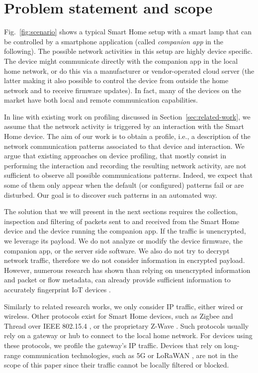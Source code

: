 \section{Problem statement and scope}
\label{sec:problem}

Fig.~\ref{fig:scenario} shows a typical Smart Home setup with a smart lamp that can be controlled by a smartphone application (called \emph{companion app} in the following).
The possible network activities in this setup are highly device specific.
The device might communicate directly with the companion app in the local home network, or do this via a manufacturer or vendor-operated cloud server (the latter making it also possible to control the device from outside the home network and to receive firmware updates). In fact, many of the devices on the market have both local and remote communication capabilities.



In line with existing work on profiling discussed in Section~\ref{sec:related-work}, we assume that the network activity is triggered by an interaction with the Smart Home device. The aim of our work is to obtain a profile, i.e., a description of the network communication patterns associated to that device and interaction. We argue that existing approaches on device profiling, that mostly consist in performing the interaction and recording the resulting network activity, are not sufficient to observe all possible communications patterns.
Indeed, we expect that some of them only appear when the default (or configured) patterns fail or are disturbed. Our goal is to discover such patterns in an automated way.

The solution that we will present in the next sections requires the collection, inspection and filtering of packets sent to and received from the Smart Home device and the device running the companion app. If the traffic is unencrypted, we leverage its payload. We do not analyze or modify the device firmware, the companion app, or the server side software. We also do not try to decrypt network traffic, therefore we do not consider information in encrypted payload. However, numerous research has shown than relying on unencrypted information and packet or flow metadata, can already provide sufficient information to accurately fingerprint IoT devices \cite{homesnitch, ping-pong, wan_iotathena_2022}. 

Similarly to related research works, we only consider IP traffic, either wired or wireless.
Other protocols exist for Smart Home devices, such as Zigbee \cite{zigbee} and Thread \cite{thread}
over IEEE 802.15.4 \cite{802-15-4}, or the proprietary Z-Wave \cite{z-wave}. Such protocols usually rely on a gateway or hub to connect to the local home network. For devices using these protocols, we profile the gateway's IP traffic.
Devices that rely on long-range communication technologies, such as 5G or LoRaWAN \cite{lorawan}, are not in the scope of this paper since their traffic cannot be locally filtered or blocked.

